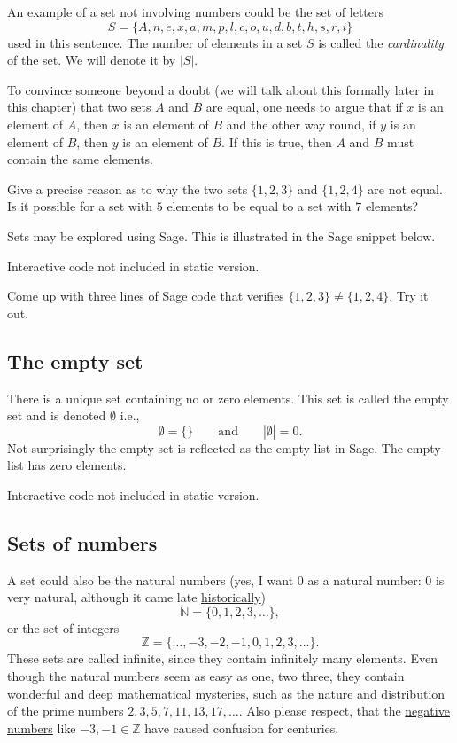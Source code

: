 An example of a set not involving numbers could be the set of letters
$$
  S=\{A, n, e, x, a, m, p, l, c, o, u, d, b, t, h, s, r, i\}
$$
used in this sentence. The number of elements in a set $S$ is called the \emph{cardinality} of the set.
We will denote it by $|S|$.

To convince someone beyond a doubt (we will talk about this formally later in this chapter) that two sets $A$ and $B$ are equal, one needs to argue that if $x$ is an element of $A$, then $x$ is an element of $B$ and the other way round, if $y$ is an element of $B$, then $y$ is an element of $B$. If this is true, then
$A$ and $B$ must contain the same elements.

\begin{exercise}
  Give a precise reason as to why the two sets $\{1, 2, 3\}$ and $\{1, 2, 4\}$ are not equal.
  Is it possible for a set with $5$ elements to be equal to a set with $7$ elements?
\end{exercise}

Sets may be explored using Sage. This is illustrated in the Sage snippet below.

\begin{sage} Interactive code not included in static version.\end{sage}


\begin{exercise}
  Come up with three lines of Sage code that verifies $\{1, 2, 3\} \neq \{1, 2, 4\}$. Try it out.
\end{exercise}

\subsection{The empty set}

There is a unique set containing no or zero elements. This set is called the empty set and
is denoted $\emptyset$ i.e.,
$$
  \emptyset = \{\}\qquad\text{and}\qquad |\emptyset| = 0.
$$
Not surprisingly the empty set is reflected as the empty list in Sage. The empty list
has zero elements.

\begin{sage} Interactive code not included in static version.\end{sage}

\subsection{Sets of numbers}

A set could also be the natural numbers (yes, I want $0$ as a natural number:
$0$ is very natural, although it came late \href{https://en.wikipedia.org/wiki/0}{historically})
$$
  \mathbb{N} = \{0, 1, 2, 3, \dots\},
$$
or the set of integers
$$
  \mathbb{Z} = \{\dots, -3, -2, -1, 0, 1, 2, 3, \dots\}.
$$
These sets are called infinite, since they contain infinitely many elements. Even though
the natural numbers seem as easy as one, two three, they contain wonderful and deep
mathematical mysteries, such as the nature and distribution of the prime numbers
$2, 3, 5, 7, 11, 13, 17, \dots$. Also please respect, that the \href{https://en.m.wikipedia.org/wiki/Negative\_number}{negative numbers} like
$-3, -1\in \mathbb{Z}$ have caused confusion for centuries.

